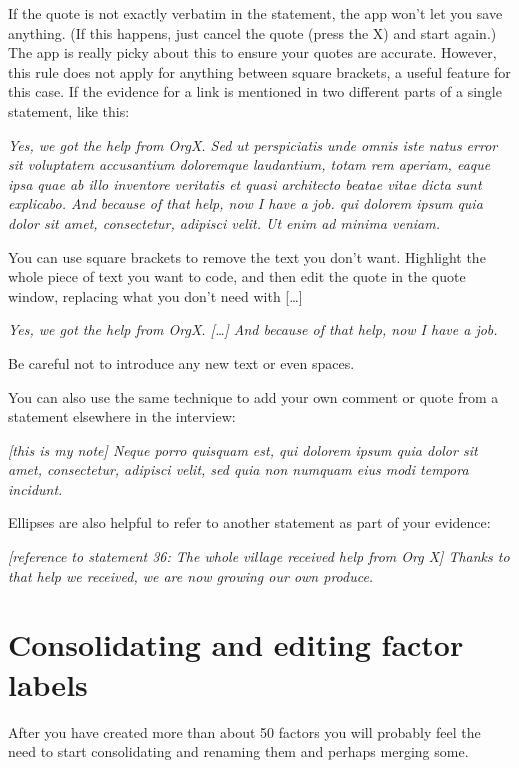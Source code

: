 \documentclass[
]{book}
\begin{document}
If the quote is not exactly verbatim in the statement, the app won't let you save anything. (If this happens, just cancel the quote (press the X) and start again.) The app is really picky about this to ensure your quotes are accurate. However, this rule does not apply for anything between square brackets, a useful feature for this case. If the evidence for a link is mentioned in two different parts of a single statement, like this:

\emph{Yes, we got the help from OrgX. Sed ut perspiciatis unde omnis iste natus error sit voluptatem accusantium doloremque laudantium, totam rem aperiam, eaque ipsa quae ab illo inventore veritatis et quasi architecto beatae vitae dicta sunt explicabo. And because of that help, now I have a job. qui dolorem ipsum quia dolor sit amet, consectetur, adipisci velit. Ut enim ad minima veniam.}

You can use square brackets to remove the text you don't want. Highlight the whole piece of text you want to code, and then edit the quote in the quote window, replacing what you don't need with {[}\ldots{]}

\emph{Yes, we got the help from OrgX. {[}\ldots{]} And because of that help, now I have a job.}

Be careful not to introduce any new text or even spaces.

You can also use the same technique to add your own comment or quote from a statement elsewhere in the interview:

\emph{{[}this is my note{]} Neque porro quisquam est, qui dolorem ipsum quia dolor sit amet, consectetur, adipisci velit, sed quia non numquam eius modi tempora incidunt.}

Ellipses are also helpful to refer to another statement as part of your evidence:

\emph{{[}reference to statement 36: The whole village received help from Org X{]} Thanks to that help we received, we are now growing our own produce.}

\hypertarget{consolidating-and-editing-factor-labels}{%
\section{Consolidating and editing factor labels}\label{consolidating-and-editing-factor-labels}}

After you have created more than about 50 factors you will probably feel the need to start consolidating and renaming them and perhaps merging some.
\end{document}
